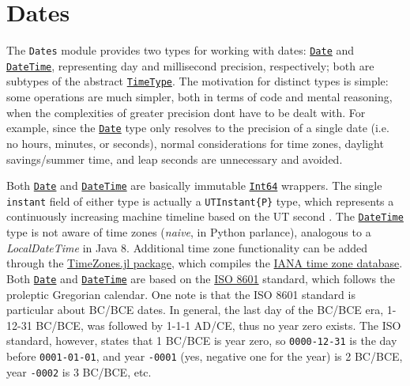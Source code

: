 \hypertarget{9507963728197011587}{}


\chapter{Dates}





The \texttt{Dates} module provides two types for working with dates: \hyperlink{4488183467971164548}{\texttt{Date}} and \hyperlink{17572689933274889838}{\texttt{DateTime}}, representing day and millisecond precision, respectively; both are subtypes of the abstract \hyperlink{4438614350756187528}{\texttt{TimeType}}. The motivation for distinct types is simple: some operations are much simpler, both in terms of code and mental reasoning, when the complexities of greater precision don{\textquotesingle}t have to be dealt with. For example, since the \hyperlink{4488183467971164548}{\texttt{Date}} type only resolves to the precision of a single date (i.e. no hours, minutes, or seconds), normal considerations for time zones, daylight savings/summer time, and leap seconds are unnecessary and avoided.



Both \hyperlink{4488183467971164548}{\texttt{Date}} and \hyperlink{17572689933274889838}{\texttt{DateTime}} are basically immutable \hyperlink{7720564657383125058}{\texttt{Int64}} wrappers. The single \texttt{instant} field of either type is actually a \texttt{UTInstant\{P\}} type, which represents a continuously increasing machine timeline based on the UT second \footnotemark[1]. The \hyperlink{17572689933274889838}{\texttt{DateTime}} type is not aware of time zones (\emph{naive}, in Python parlance), analogous to a \emph{LocalDateTime} in Java 8. Additional time zone functionality can be added through the \href{https://github.com/JuliaTime/TimeZones.jl/}{TimeZones.jl package}, which compiles the \href{http://www.iana.org/time-zones}{IANA time zone database}. Both \hyperlink{4488183467971164548}{\texttt{Date}} and \hyperlink{17572689933274889838}{\texttt{DateTime}} are based on the \href{https://en.wikipedia.org/wiki/ISO\_8601}{ISO 8601} standard, which follows the proleptic Gregorian calendar. One note is that the ISO 8601 standard is particular about BC/BCE dates. In general, the last day of the BC/BCE era, 1-12-31 BC/BCE, was followed by 1-1-1 AD/CE, thus no year zero exists. The ISO standard, however, states that 1 BC/BCE is year zero, so \texttt{0000-12-31} is the day before \texttt{0001-01-01}, and year \texttt{-0001} (yes, negative one for the year) is 2 BC/BCE, year \texttt{-0002} is 3 BC/BCE, etc.




